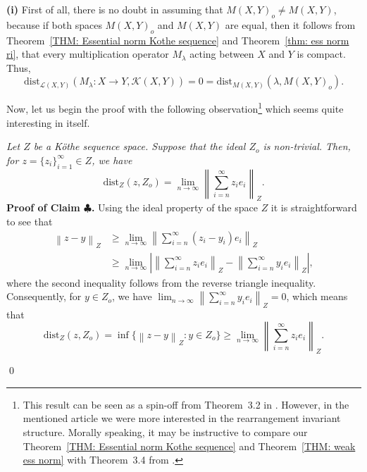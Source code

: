 \documentclass[11pt]{amsart}
\theoremstyle{definition}
\theoremstyle{definition}
\theoremstyle{definition}
\theoremstyle{definition}
\theoremstyle{definition}
\theoremstyle{definition}
\theoremstyle{definition}
\theoremstyle{definition}
\numberwithin{equation}{section}
\numberwithin{equation}{section}
\numberwithin{equation}{section}
\theoremstyle{definition}
\theoremstyle{definition}
\theoremstyle{definition}
\theoremstyle{definition}
\theoremstyle{definition}
\theoremstyle{definition}
\newcommand{\norm}[1]{\left\lVert#1\right\rVert}
\newcommand{\abs}[1]{\left\lvert#1\right\rvert}
\renewenvironment{proof}{\noindent {\bf Proof.}}{\qed}
\begin{document}
\begin{proof}
	{\bf (i)} First of all, there is no doubt in assuming that $M(X,Y)_o \neq M(X,Y)$, because if both spaces $M(X,Y)_o$
	and $M(X,Y)$ are equal, then it follows from Theorem~\ref{THM: Essential norm Kothe sequence} and Theorem~\ref{thm: ess norm ri},
	that every multiplication operator $M_{\lambda}$ acting between $X$ and $Y$ is compact. Thus,
	\begin{equation*}
		\text{dist}_{\mathscr{L}(X,Y)}(M_{\lambda} \colon X \rightarrow Y, {\mathscr K}(X,Y)) = 0 = \text{dist}_{M(X,Y)}(\lambda, M(X,Y)_o).
	\end{equation*}
	
	Now, let us begin the proof with the following observation\footnote{This result can be seen as a spin-off from Theorem~3.2 in \cite{KKT22}.
	However, in the mentioned article we were more interested in the rearrangement invariant structure. Morally speaking, it may be instructive
	to compare our Theorem~\ref{THM: Essential norm Kothe sequence} and Theorem~\ref{THM: weak ess norm} with Theorem~3.4 from \cite{KKT22}.}
	which seems quite interesting in itself.
	
	\vspace{5pt} 
	{\it Let $Z$ be a K{\" o}the sequence space. Suppose that the ideal $Z_o$ is non-trivial.
	Then, for $z = \{z_i\}_{i=1}^{\infty} \in Z$, we have}
	\begin{equation}
		\text{dist}_Z(z,Z_o) = \lim\limits_{n \rightarrow \infty} \norm{ \sum_{i=n}^{\infty} z_i e_i }_Z.
	\end{equation}
	\vspace{5pt}
	\noindent
	{\bf Proof of Claim $\clubsuit$.}
		Using the ideal property of the space $Z$ it is straightforward to see that 
		\begin{align*}
			\norm{z - y}_Z
				& \geqslant \lim\limits_{n \rightarrow \infty} \norm{ \sum_{i=n}^{\infty} (z_i - y_i) e_i }_Z \\
				& \geqslant \lim\limits_{n \rightarrow \infty} \abs{\norm{ \sum_{i=n}^{\infty} z_i e_i }_Z - \norm{ \sum_{i=n}^{\infty} y_i e_i }_Z},
		\end{align*}
		where the second inequality follows from the reverse triangle inequality. Consequently, for $y \in Z_o$,
		we have $\lim_{n \rightarrow \infty} \norm{ \sum_{i=n}^{\infty} y_i e_i }_Z = 0$, which means that
		\begin{equation*}
			\text{dist}_Z(z,Z_o)
				= \inf\{\norm{z - y}_Z \colon y \in Z_o\}
				\geqslant \lim\limits_{n \rightarrow \infty} \norm{ \sum_{i=n}^{\infty} z_i e_i }_Z.
		\end{equation*}
		

\end{proof}
\end{document}
